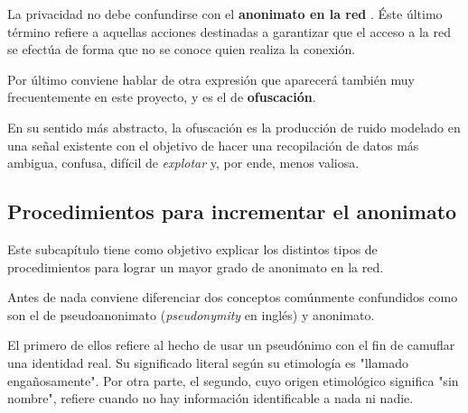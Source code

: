La privacidad no debe confundirse con el \textbf{anonimato en la red}
. Éste último
término refiere a aquellas acciones destinadas a garantizar que el
acceso a la red se efectúa de forma que no se conoce quien realiza la
conexión.

Por último conviene hablar de otra expresión que aparecerá también muy
frecuentemente en este proyecto, y es el de \textbf{ofuscación}. 

En su sentido más abstracto, la ofuscación es la producción de ruido
modelado en una señal existente con el objetivo de hacer una
recopilación de datos más ambigua, confusa, difícil de
\textit{explotar} y, por ende, menos valiosa.

\subsection{Procedimientos para incrementar el anonimato}

Este subcapítulo tiene como objetivo explicar los distintos tipos de procedimientos para lograr un mayor grado de anonimato en la red. 

Antes de nada conviene diferenciar dos conceptos comúnmente confundidos como son el de pseudoanonimato (\textit{pseudonymity} en inglés) y anonimato.

El primero de ellos refiere al hecho de usar un pseudónimo con el fin de camuflar una identidad real. Su significado literal según su etimología es  "llamado engañosamente".
Por otra parte, el segundo, cuyo origen etimológico significa "sin nombre", refiere cuando no hay información identificable a nada ni nadie.

